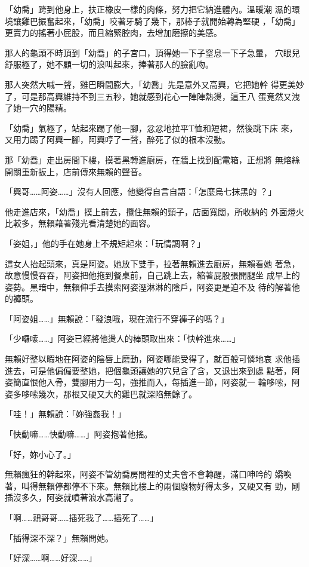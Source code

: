 「幼喬」跨到他身上，扶正橡皮一樣的肉條，努力把它納進體內。溫暖潮
濕的環境讓雞巴振奮起來，「幼喬」咬著牙騎了幾下，那棒子就開始轉為堅硬
，「幼喬」更賣力的搖著小屁股，而且縮緊腔肉，去增加磨擦的美感。

那人的龜頭不時頂到「幼喬」的子宮口，頂得她一下子窒息一下子急暈，
穴眼兒舒服極了，她不顧一切的浪叫起來，捧著那人的臉亂吻。

那人突然大喊一聲，雞巴瞬間膨大，「幼喬」先是意外又高興，它把她幹
得更美妙了，可是那高興維持不到三五秒，她就感到花心一陣陣熱燙，這王八
蛋竟然又洩了她一穴的陽精。

「幼喬」氣極了，站起來踢了他一腳，忿忿地拉平T恤和短裙，然後跳下床
來，又用力踢了阿興一腳，阿興哼了一聲，醉死了似的根本沒動。

那「幼喬」走出房間下樓，摸著黑轉進廚房，在牆上找到配電箱，正想將
無熔絲開關重新扳上，店前傳來無賴的聲音。

「興哥……阿姿……」沒有人回應，他變得自言自語：「怎麼烏七抹黑的
？」

他走進店來，「幼喬」撲上前去，攬住無賴的頸子，店面寬闊，所收納的
外面燈火比較多，無賴藉著殘光看清楚她的面容。

「姿姐，」他的手在她身上不規矩起來：「玩情調啊？」

這女人抬起頭來，真是阿姿。她放下雙手，拉著無賴進去廚房，無賴看她
著急，故意慢慢吞吞，阿姿把他拖到餐桌前，自己跳上去，縮著屁股張開腿坐
成早上的姿勢。黑暗中，無賴伸手去摸索阿姿溼淋淋的陰戶，阿姿更是迫不及
待的解著他的褲頭。

「阿姿姐……」無賴說：「發浪哦，現在流行不穿褲子的嗎？」

「少囉嗦……」阿姿已經將他燙人的棒頭取出來：「快幹進來……」

無賴好整以暇地在阿姿的陰唇上磨動，阿姿哪能受得了，就百般可憐地哀
求他插進去，可是他偏偏要整她，把個龜頭讓她的穴兒含了含，又退出來到處
點著，阿姿簡直恨他入骨，雙腳用力一勾，強推而入，每插進一節，阿姿就一
輪哆嗦，阿姿多哆嗦幾次，那根又硬又大的雞巴就深陷無餘了。

「哇！」無賴說：「妳強姦我！」

「快動嘛……快動嘛……」阿姿抱著他搖。

「好，妳小心了。」

無賴瘋狂的幹起來，阿姿不管幼喬房間裡的丈夫會不會轉醒，滿口呻吟的
嬌喚著，叫得無賴停都停不下來。無賴比樓上的兩個廢物好得太多，又硬又有
勁，剛插沒多久，阿姿就噴著浪水高潮了。

「啊……親哥哥……插死我了……插死了……」

「插得深不深？」無賴問她。

「好深……啊……好深……」

